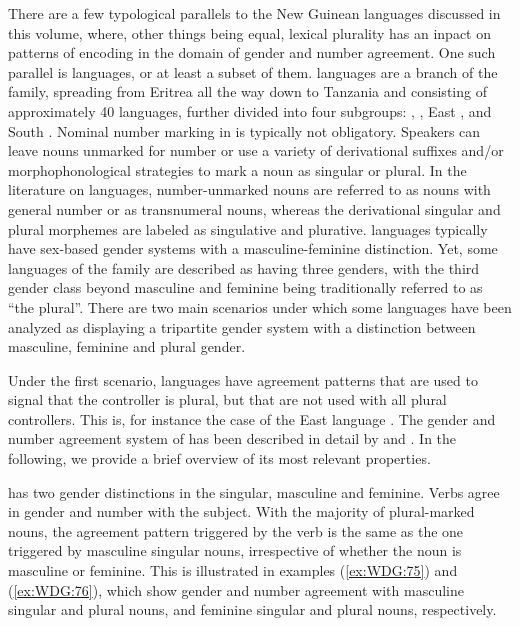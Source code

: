 \documentclass[output=collectionpaper]{langsci/langscibook}
\begin{document}
There are a few typological parallels to the New Guinean languages discussed in this volume, where, other things being equal, lexical plurality has an inpact on patterns of encoding in the domain of gender and number agreement. One such parallel is  languages, or at least a subset of them.  languages are a branch of the  family, spreading from Eritrea all the way down to Tanzania and consisting of approximately 40 languages, further divided into four subgroups: , , East , and South . Nominal number marking in  is typically not obligatory. Speakers can leave nouns unmarked for number or use a variety of derivational suffixes and/or morphophonological strategies to mark a noun as singular or plural. In the literature on  languages, number-unmarked nouns are referred to as nouns with general number or as transnumeral nouns, whereas the derivational singular and plural morphemes are labeled as singulative and plurative.  languages typically have sex-based gender systems with a masculine-feminine distinction. Yet, some languages of the family are described as having three genders, with the third gender class beyond masculine and feminine being traditionally referred to as ``the plural''. There are two main scenarios under which some  languages have been analyzed as displaying a tripartite gender system with a distinction between masculine, feminine and plural gender.

Under the first scenario, languages have agreement patterns that are used to signal that the controller is plural, but that are not used with all plural controllers. This is, for instance the case of the East  language . The gender and number agreement system of  has been described in detail by \cite{Corbett1987} and \cite{Corbett2000}. In the following, we provide a brief overview of its most relevant properties.

 has two gender distinctions in the singular, masculine and feminine. Verbs agree in gender and number with the subject. With the majority of plural-marked nouns, the agreement pattern triggered by the verb is the same as the one triggered by masculine singular nouns, irrespective of whether the noun is masculine or feminine. This is illustrated in examples (\ref{ex:WDG:75}) and (\ref{ex:WDG:76}), which show gender and number agreement with masculine singular and plural nouns, and feminine singular and plural nouns, respectively.
\end{document}
